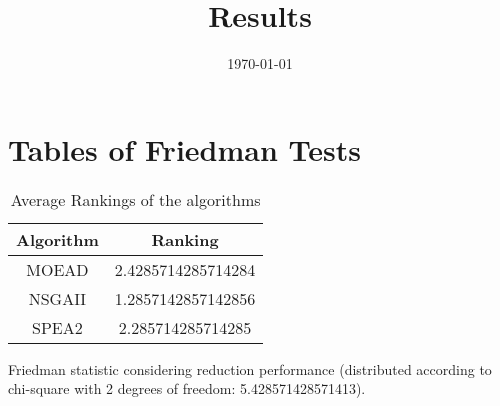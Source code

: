\documentclass{article}
\title{Results}
\author{}
\date{\today}
\begin{document}
\oddsidemargin 0in \topmargin 0in\maketitle
\section{Tables of Friedman Tests}
\begin{table}[!htp]
\centering
\caption{Average Rankings of the algorithms
}\begin{tabular}{c|c}
Algorithm&Ranking\\
\hline
MOEAD&2.4285714285714284\\
NSGAII&1.2857142857142856\\
SPEA2&2.285714285714285\\
\end{tabular}
\end{table}


Friedman statistic considering reduction performance (distributed according to chi-square with 2 degrees of freedom: 5.428571428571413).
\end{document}
